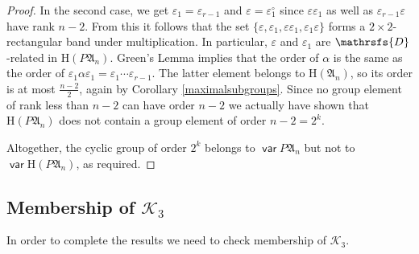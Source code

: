 \documentclass[11pt,reqno]{amsart}
\DeclareMathOperator{\var}{\mathsf{var}}
\numberwithin{equation}{section}
\theoremstyle{remark}
\def\Dc{\mathrsfs{D}}
\def\ep{\varepsilon}
\def\H{\mathrm H}
\def\A{\mathfrak{A}}
\begin{document}
\begin{proof}
In the second case, we get $\ep_1=\ep_{r-1}$ and $\ep=\ep_1^\circ$
since $\ep\ep_1$ as well as $\ep_{r-1}\ep$ have  rank $n-2$. From
this it follows that the set $\{\ep,\ep_1,\ep\ep_1,\ep_1\ep\}$
forms a $2\times 2$-rectangular band under multiplication. In
particular, $\ep$ and $\ep_1$ are $\Dc$-related in $\H (P\A_n)$.
Green's Lemma implies that the order of $\alpha$ is the same as
the order of $\ep_1\alpha\ep_1=\ep_1\cdots\ep_{r-1}$. The latter
element belongs to $\H(\A_n)$, so its order is at most
$\frac{n-2}2$, again by Corollary \ref{maximalsubgroups}. Since no
group element of rank less than $n-2$ can have order $n-2$ we
actually have shown that $\H (P\A_n)$ does not contain a group
element of order $n-2=2^k$.

Altogether, the cyclic group of order $2^k$ belongs to $\var
P\A_n$ but not to $\var\H (P\A_n)$, as required.
\end{proof}

\subsection{Membership of $\mathcal{K}_3$}
In order to complete the results we need to check membership of
$\mathcal{K}_3$.
\end{document}
